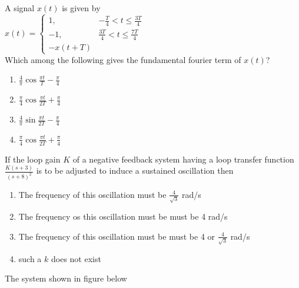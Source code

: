 \item A signal $x(t)$ is given by \\
$ x(t) = \begin{cases} 
1, & -\frac{T}{4} < t \leq \frac{3T}{4} \\
-1, & \frac{3T}{4} < t \leq \frac{7T}{4} \\
-x(t+T) 
\end{cases} $ \\

Which among the following gives the fundamental fourier term of $x(t)$? 
\begin{enumerate}
\item $\frac{4}{\pi} \cos{\frac{\pi t}{T}-\frac{\pi}{4}}$
\item $\frac{\pi}{4} \cos{\frac{\pi t}{2T}+\frac{\pi}{4}}$
\item $\frac{4}{\pi} \sin{\frac{\pi t}{2T}-\frac{\pi}{4}}$
\item $\frac{\pi}{4} \cos{\frac{\pi t}{2T}+\frac{\pi}{4}}$ \\
\end{enumerate}

\item If the loop gain $K$ of a negative feedback system having a loop transfer function $\frac{K(s+3)}{(s+8)^2}$ is to be adjusted to induce a sustained oscillation then 
\begin{enumerate}
\item The frequency of this oscillation must be $\frac{4}{\sqrt{3}}$ rad/s
\item The frequency os this oscillation must be must be 4 rad/s
\item The frequency of this oscillation must be must be 4 or $\frac{4}{\sqrt{3}}$ rad/s
\item such a $k$ does not exist \\
\end{enumerate}

\item The system shown in figure below 

